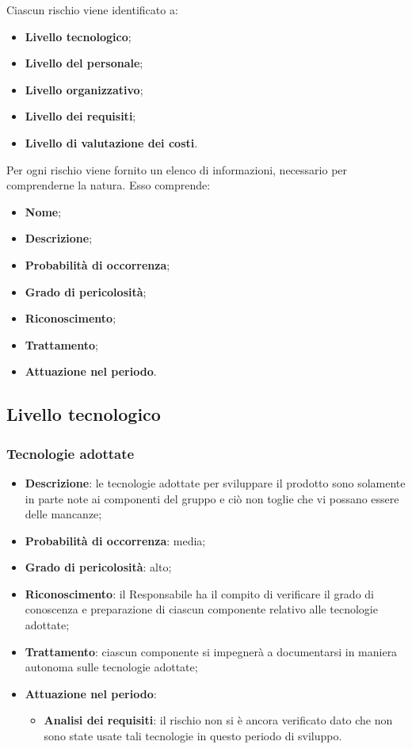 Ciascun rischio viene identificato a:
\begin{itemize}
	\item \textbf{Livello tecnologico};
	\item \textbf{Livello del personale};
	\item \textbf{Livello organizzativo};
	\item \textbf{Livello dei requisiti};
	\item \textbf{Livello di valutazione dei costi}.
\end{itemize}
Per ogni rischio viene fornito un elenco di informazioni, necessario per comprenderne la natura. Esso comprende:
\begin{itemize}
	\item \textbf{Nome};
	\item \textbf{Descrizione};
	\item \textbf{Probabilità di occorrenza};
	\item \textbf{Grado di pericolosità};
	\item \textbf{Riconoscimento};
	\item \textbf{Trattamento};
	\item \textbf{Attuazione nel periodo}.
\end{itemize}
	\subsection{Livello tecnologico}
		\subsubsection{Tecnologie adottate}
		\begin{itemize}
			\item \textbf{Descrizione}: le tecnologie adottate per sviluppare il prodotto sono solamente in parte note ai componenti del gruppo e ciò non toglie che vi possano essere delle mancanze;
			\item \textbf{Probabilità di occorrenza}: media;
			\item \textbf{Grado di pericolosità}: alto;
			\item \textbf{Riconoscimento}: il Responsabile ha il compito di verificare il grado di conoscenza e preparazione di ciascun componente relativo alle tecnologie adottate;
			\item \textbf{Trattamento}: ciascun componente si impegnerà a documentarsi in maniera autonoma sulle tecnologie adottate;
			\item \textbf{Attuazione nel periodo}:
			\begin{itemize}
				\item \textbf{Analisi dei requisiti}: il rischio non si è ancora verificato dato che non sono state usate tali tecnologie in questo periodo di sviluppo.
			\end{itemize}
		\end{itemize}
